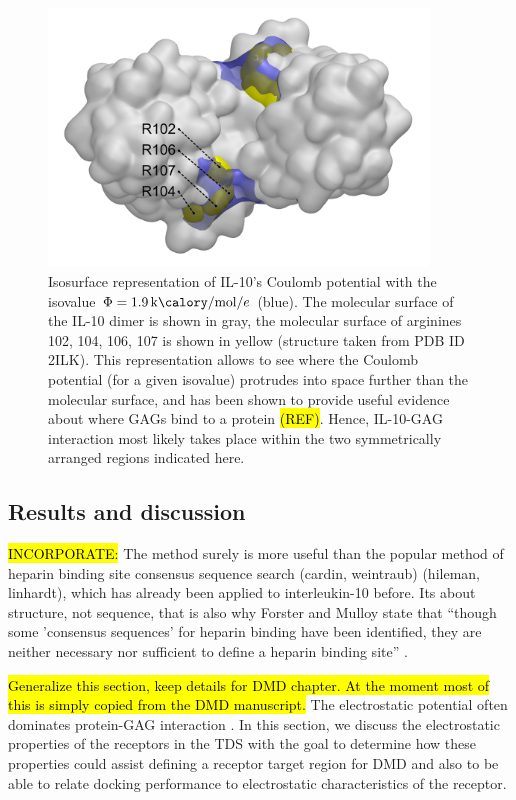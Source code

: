 \begin{figure}
\centering
\includegraphics[width=0.9\textwidth]{gfx/bspred/SI_figure_IL-10_coulomb_isosurface_1_9kcalmol.png}
\caption[]{
Isosurface representation of IL-10's Coulomb potential with the isovalue $\Phi =
\SI{1.9}{\kilo\calory\per\mole\per\elementarycharge}$ (blue). The molecular
surface of the IL-10 dimer is shown in gray, the molecular surface of arginines
102, 104, 106, 107 is shown in yellow (structure taken from PDB ID 2ILK). This
representation allows to see where the Coulomb potential (for a given isovalue)
protrudes into space further than the molecular surface, and has been shown to
provide useful evidence about where GAGs bind to a protein \hl{(REF)}. Hence,
IL-10-GAG interaction most likely takes place within the two symmetrically
arranged regions indicated here.
}
\label{fig:bspred:il10_estatic_pred}
\end{figure}


\subsection{Results and discussion}
\hl{INCORPORATE:} The method surely is more useful than the popular method of
heparin binding site consensus sequence search (cardin, weintraub) (hileman,
linhardt), which has already been applied to interleukin-10 before. Its about
structure, not sequence, that is also why Forster and Mulloy state that
\enquote{though some 'consensus sequences' for heparin binding have been
identified, they are neither necessary nor sufficient to define a heparin
binding site} \cite{hp_binding_sites_mulloy_2006}.



\hl{Generalize this section, keep details for DMD chapter. At the moment most of
this is simply copied from the DMD manuscript.}
The electrostatic potential often dominates protein-GAG interaction
\cite{gandhi_structure_2008}. In this section, we discuss the electrostatic
properties of the receptors in the TDS with the goal to determine how these
properties could assist defining a receptor target region for DMD and also to be
able to relate docking performance to electrostatic characteristics of the
receptor.


